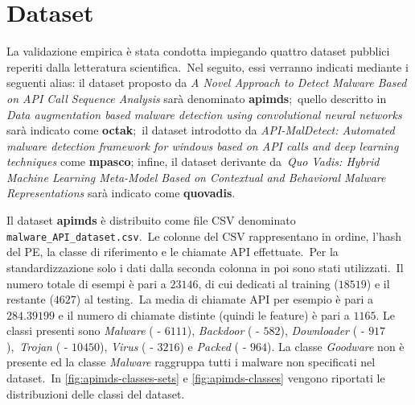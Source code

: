 \newcommand{\datasetapimds}{\textit{A Novel Approach to Detect Malware Based on API Call Sequence Analysis}}
\newcommand{\datasetoctak}{\textit{Data augmentation based malware detection using convolutional neural networks}}
\newcommand{\datasetmpasco}{\textit{API-MalDetect: Automated malware detection framework for windows based on API calls and deep learning techniques}}
\newcommand{\datasetquovaids}{\textit{Quo Vadis: Hybrid Machine Learning Meta-Model Based on Contextual and Behavioral Malware Representations}}
\newcommand{\clsper}[3]{\textit{#1} (\percc{#2} - $#3$)}
\section{Dataset}

La validazione empirica è stata condotta impiegando quattro dataset pubblici reperiti dalla letteratura scientifica.\
Nel seguito, essi verranno indicati mediante i seguenti alias: il dataset proposto da \datasetapimds{} sarà denominato \textbf{apimds};\
quello descritto in \datasetoctak{} sarà indicato come \textbf{octak};\
il dataset introdotto da \datasetmpasco{} come \textbf{mpasco}; infine, il dataset derivante da\
\datasetquovaids{} sarà indicato come \textbf{quovadis}.

Il dataset \textbf{apimds} è distribuito come file CSV denominato \texttt{malware\_API\_dataset.csv}.\
Le colonne del CSV rappresentano in ordine, l'hash del PE, la classe di riferimento e le chiamate API effettuate.\
Per la standardizzazione solo i dati dalla seconda colonna in poi sono stati utilizzati.\
Il numero totale di esempi è pari a $23146$, di cui  dedicati al training ($18519$) e il restante ($4627$) al testing.\
La media di chiamate API per esempio è pari a $284.39199$ e il numero di chiamate distinte (quindi le feature) è pari a $1165$.
Le classi presenti sono \clsper{Malware}{27.4}{6111}, \clsper{Backdoor}{2.6}{582}, \clsper{Downloader}{4,1}{917},\
\clsper{Trojan}{46.9}{10450}, \clsper{Virus}{14.6}{3216} e \clsper{Packed}{4.3}{964}.
La classe \textit{Goodware} non è presente ed la classe \textit{Malware} raggruppa tutti i malware non specificati nel dataset.\
In \autoref{fig:apimds-classes-sets} e \autoref{fig:apimds-classes} vengono riportati le distribuzioni delle classi del dataset.

